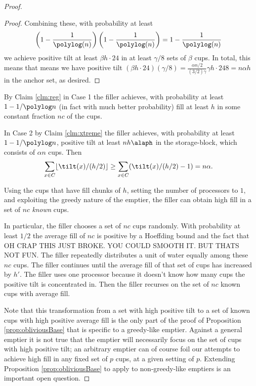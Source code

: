 \begin{proof}
\begin{proof}
  Combining these, with probability at least
  $$\left(1-\frac{1}{\polylog(n)}\right)\left(1-\frac{1}{\polylog(n)}\right) =
  1-\frac{1}{\polylog(n)}$$ we achieve positive
  tilt at least $\beta h\cdot 24$ in at least $\gamma/8$ sets of $\beta$ cups. In
  total, this means that means we have positive tilt $(\beta h \cdot 24)(\gamma/8) =
  \frac{\alpha n/2}{(3/2)\gamma}\gamma h \cdot{24}{8} = n\alpha h$ in the anchor set, as desired.

\end{proof}

  By Claim \ref{clm:reg} in Case 1 the filler achieves, with probability at least
  $1-1/\polylog n$ (in fact with much better probability) fill at least $h$ in
  some constant fraction $nc$ of the cups.

  In Case 2 by Claim \ref{clm:xtreme} the filler achieves, with probability at least
  $1-1/\polylog n$, positive tilt at least $nh\alaph$ in the storage-block,
  which consists of $\alpha n$ cups. Then 
  $$\sum_{x\in C} \lfloor \tilt(x) / (h/2) \rfloor \ge \sum_{x\in C} (\tilt(x) / (h/2) -1) = n\alpha.$$

  Using the cups that have fill chunks of $h$, setting the number of processors to $1$, and
  exploiting the greedy nature of the emptier, the filler can obtain high fill
  in a set of $nc$ \emph{known} cups.

  In particular, the filler chooses a set of $nc$ cups randomly.
  With probability at least $1/2$ the average fill of $nc$ is positive by a
  Hoeffding bound and the fact that 
  OH CRAP THIS JUST BROKE. YOU COULD SMOOTH IT. BUT THATS NOT FUN.
  The filler repeatedly distributes a unit of water equally among these $nc$ cups. 
  The filler continues until the average fill of that set of cups has increased
  by $h'$. The filler uses one processor because it doesn't know how many cups
  the positive tilt is concentrated in. Then the filler recurses on the set of
  $nc$ known cups with average fill.

  Note that this transformation from a set with high positive tilt to a set of
  known cups with high positive average fill is the only part of the proof of
  Proposition \ref{prop:obliviousBase} that is specific to a greedy-like
  emptier. Against a general emptier it is not true that the emptier will
  necessarily focus on the set of cups with high positive tilt; an arbitrary
  emptier can of course foil our attempts to achieve high fill in any fixed set
  of $p$ cups, at a given setting of $p$. Extending Proposition
  \ref{prop:obliviousBase} to apply to non-greedy-like emptiers is an important
  open question.
\end{proof}
